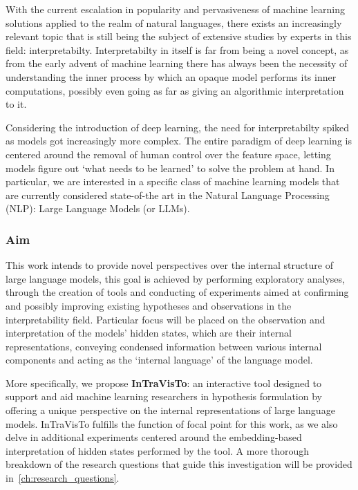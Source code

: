 With the current escalation in popularity and pervasiveness of machine learning solutions applied to the realm of natural languages, there exists an increasingly relevant topic that is still being the subject of extensive studies by experts in this field: interpretabilty.
Interpretabilty in itself is far from being a novel concept, as from the early advent of machine learning there has always been the necessity of understanding the inner process by which an opaque model performs its inner computations, possibly even going as far as giving an algorithmic interpretation to it.

Considering the introduction of deep learning, the need for interpretabilty spiked as models got increasingly more complex.
The entire paradigm of deep learning is centered around the removal of human control over the feature space, letting models figure out `what needs to be learned' to solve the problem at hand.
In particular, we are interested in a specific class of machine learning models that are currently considered state-of-the art in the Natural Language Processing (NLP): Large Language Models (or LLMs).

\subsubsection*{Aim}

This work intends to provide novel perspectives over the internal structure of large language models, this goal is achieved by performing exploratory analyses, through the creation of tools and conducting of experiments aimed at confirming and possibly improving existing hypotheses and observations in the interpretability field.
Particular focus will be placed on the observation and interpretation of the models' hidden states, which are their internal representations, conveying condensed information between various internal components and acting as the `internal language' of the language model.

More specifically, we propose \textbf{InTraVisTo}: an interactive tool designed to support and aid machine learning researchers in hypothesis formulation by offering a unique perspective on the internal representations of large language models.
InTraVisTo fulfills the function of focal point for this work, as we also delve in additional experiments centered around the embedding-based interpretation of hidden states performed by the tool.
A more thorough breakdown of the research questions that guide this investigation will be provided in~\cref{ch:research_questions}.

